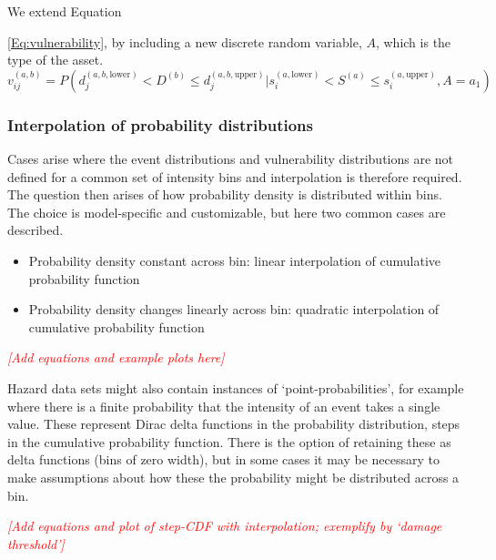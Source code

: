 \documentclass[a4paper,11pt]{extarticle} %
\begin{document}
We extend Equation~{\ref{Eq:vulnerability}, by including a new discrete random variable, $A$, which is the type of the asset.
\begin{equation}
    \label{Eq:vulnerability}
    v^{(a, b)}_{ij} = P \left( d^{(a,b,\text{lower})}_j < D^{(b)} \le d^{(a,b,\text{upper})}_j | s^{(a, \text{lower})}_i < S^{(a)} \le s^{(a, \text{upper})}_i, A = a_1 \right)
\end{equation}


\subsubsection{Interpolation of probability distributions}
Cases arise where the event distributions and vulnerability distributions are not defined for a common set of intensity bins and interpolation is therefore required. The question then arises of how probability density is distributed within bins. The choice is model-specific and customizable, but here two common cases are described.

\begin{itemize}
    \item Probability density constant across bin: linear interpolation of cumulative probability function
    \item Probability density changes linearly across bin: quadratic interpolation of cumulative probability function
\end{itemize}

{\textcolor{red}{\emph{[Add equations and example plots here]}}}

Hazard data sets might also contain instances of `point-probabilities', for example where there is a finite probability that the intensity of an event takes a single value. These represent Dirac delta functions in the probability distribution, steps in the cumulative probability function. There is the option of retaining these as delta functions (bins of zero width), but in some cases it may be necessary to make assumptions about how these the probability might be distributed across a bin.

{\textcolor{red}{\emph{[Add equations and plot of step-CDF with interpolation; exemplify by `damage threshold']}}}

\begin{figure}[ht]

    \begin{framed}


\end{framed}
\end{figure}}
\end{document}
